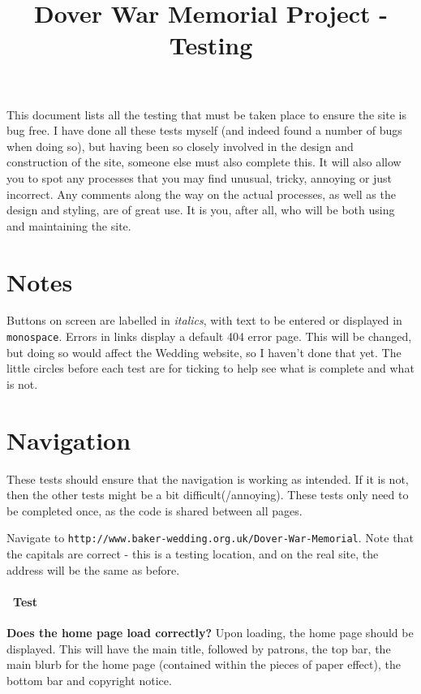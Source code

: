 \documentclass[12pt]{article}
\title{\vspace{-1cm}\textbf{Dover War Memorial Project - Testing}\vspace{-1cm}}
\date{}
\author{}
\newcounter{Test}
\newcommand{\test}[1]{%
\stepcounter{Test}%
\paragraph{\Circle\ Test \theTest} \textbf{#1} }
\begin{document}
\maketitle

This document lists all the testing that must be taken place to ensure the site is bug free. I have done all these tests myself (and indeed found a number of bugs when doing so), but having been so closely involved in the design and construction of the site, someone else must also complete this. It will also allow you to spot any processes that you may find unusual, tricky, annoying or just incorrect. Any comments along the way on the actual processes, as well as the design and styling, are of great use. It is you, after all, who will be both using and maintaining the site. \smiley

\tableofcontents
\newpage


\section{Notes}
Buttons on screen are labelled in \textit{italics}, with text to be entered or displayed in \texttt{monospace}. Errors in links display a default 404 error page. This will be changed, but doing so would affect the Wedding website, so I haven't done that yet. The little circles before each test are for ticking to help see what is complete and what is not.

\section{Navigation}

These tests should ensure that the navigation is working as intended. If it is not, then the other tests might be a bit difficult(/annoying). These tests only need to be completed once, as the code is shared between all pages.

Navigate to \texttt{http://www.baker-wedding.org.uk/Dover-War-Memorial}. Note that the capitals are correct - this is a testing location, and on the real site, the address will be the same as before.
\test {Does the home page load correctly?}
Upon loading, the home page should be displayed. This will have the main title, followed by patrons, the top bar, the main blurb for the home page (contained within the pieces of paper effect), the bottom bar and copyright notice.
\end{document}
